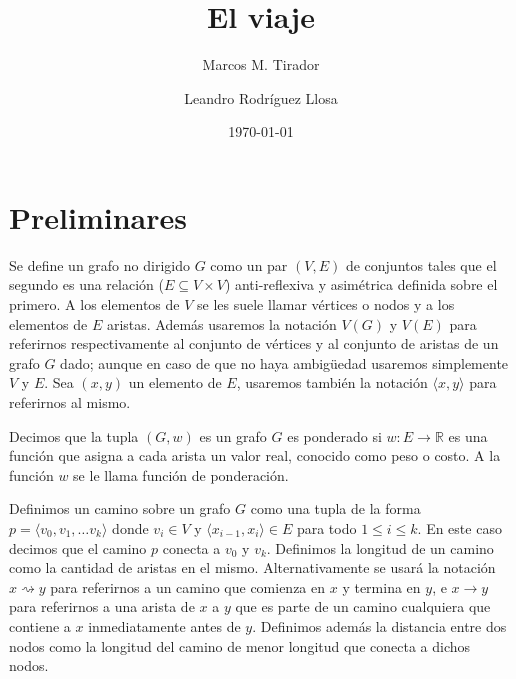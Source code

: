 \documentclass[10pt]{amsart}
\theoremstyle{definition}
\numberwithin{equation}{section}
\newcommand{\rr}{\mathbb{R}}
\begin{document}
	
	\mbox{}
	\title{El viaje}
	
	\author{Marcos M. Tirador}
	\address{Facultad de Matem\'atica y Computaci\'on \\ Universidad de La Habana \\ Ciudad de La Habana \\ Cuba}
	
	
	\author{Leandro Rodr\'iguez Llosa}
	\address{Facultad de Matem\'atica y Computaci\'on \\ Universidad de La Habana \\ Ciudad de La Habana \\ Cuba}
		

\date{\today}


\bigskip
\maketitle


\bigskip

\section{Preliminares}
	Se define un grafo no dirigido $G$ como un par $(V,E)$ de conjuntos tales que el segundo es una relaci\'on ($E\subseteq V \times V$) anti-reflexiva y asim\'etrica definida sobre el primero. A los elementos de $V$ se les suele llamar v\'ertices o nodos y a los elementos de $E$ aristas. Adem\'as usaremos la notaci\'on $V(G)$ y $V(E)$ para referirnos respectivamente al conjunto de v\'ertices y al conjunto de aristas  de un grafo $G$ dado; aunque en caso de que no haya ambig\"uedad usaremos simplemente $V$ y $E$. Sea $(x,y)$ un elemento de $E$, usaremos tambi\'en la notaci\'on $\langle x,y \rangle$ para referirnos al mismo.
	
	 Decimos que la tupla $(G,w)$ es un grafo $G$ es ponderado si $w\colon E \rightarrow \rr$ es una funci\'on que asigna a cada arista un valor real, conocido como peso o costo. A la funci\'on $w$ se le llama funci\'on de ponderaci\'on. 
	
	Definimos un camino sobre un grafo $G$ como una tupla de la forma $p = \langle v_0,v_1, \dots v_k \rangle$ donde $v_i \in V$ y $\langle x_{i-1},x_i \rangle \in E$ para todo $1\leq i \leq k$. En este caso decimos que el camino $p$ conecta a $v_0$ y $v_k$. Definimos la longitud de un camino como la cantidad de aristas en el mismo. Alternativamente se usar\'a la notaci\'on $x \rightsquigarrow y$ para referirnos a un camino que comienza en $x$ y termina en $y$, e $x \rightarrow y$ para referirnos a una arista de $x$ a $y$ que es parte de un camino cualquiera que contiene a $x$ inmediatamente antes de $y$. Definimos adem\'as la distancia entre dos nodos como la longitud del camino de menor longitud que conecta a dichos nodos.
	
\end{document}
